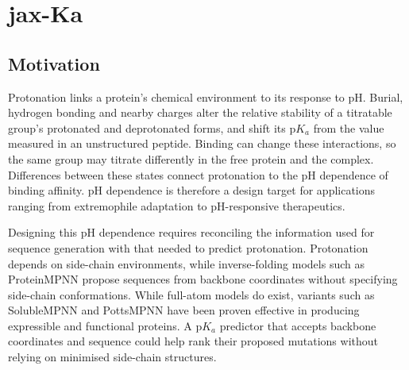 \chapter{jax-Ka}
\label{ch:jax-ka}


\section{Motivation}
\label{sec:jaxka-motivation}

Protonation links a protein's chemical environment to its response to pH. Burial, hydrogen bonding and nearby charges alter the relative stability of a titratable group's protonated and deprotonated forms, and shift its $\mathrm{p}K_a$ from the value measured in an unstructured peptide.\supercite{grimsleySummaryMeasuredPK2009} Binding can change these interactions, so the same group may titrate differently in the free protein and the complex. Differences between these states connect protonation to the pH dependence of binding affinity.\supercite{onufrievProtonationPKChanges2013} pH dependence is therefore a design target for applications ranging from extremophile adaptation to pH-responsive therapeutics.

Designing this pH dependence requires reconciling the information used for sequence generation with that needed to predict protonation. Protonation depends on side-chain environments, while inverse-folding models such as ProteinMPNN propose sequences from backbone coordinates without specifying side-chain conformations.\supercite{dauparasRobustDeepLearningbased2022} While full-atom models do exist, variants such as SolubleMPNN and PottsMPNN have been proven effective in producing expressible and functional proteins.\supercite{dauparasRobustDeepLearningbased2022,birnbaumBeyondNativeSequence2026} A $\mathrm{p}K_a$ predictor that accepts backbone coordinates and sequence could help rank their proposed mutations without relying on minimised side-chain structures.

